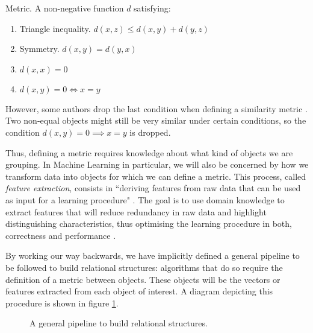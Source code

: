 \documentclass[../main.tex]{subfiles} \label{chapter_soa}
\begin{document}
\theoremstyle{definition}
\begin{definition}{Metric}.
\label{def_metric}
A non-negative function $d$ satisfying:
\begin{enumerate}
\item Triangle inequality. $d(x, z) \leq d(x, y) + d(y, z) $
\item Symmetry. $d(x, y) = d(y, x)$
\item $d(x, x) = 0$
\item $d(x, y) = 0 \iff x = y$
\end{enumerate}
\end{definition}
\par However, some authors drop the last condition when defining a similarity metric \cite{Goshtasby2012}. Two non-equal objects might still be very similar under certain conditions, so the condition $d(x, y) = 0 \implies x = y$ is dropped.
\par Thus, defining a metric requires knowledge about what kind of objects we are grouping. In Machine Learning in particular, we will also be concerned by how we transform data into objects for which we can define a metric. This process, called \emph{feature extraction}, consists in ``deriving features from raw data that can be used as input for a learning procedure" \cite{hastie2008}. The goal is to use domain knowledge to extract features that will reduce redundancy in raw data and highlight distinguishing characteristics, thus optimising the learning procedure in both, correctness and performance \cite{Bishop2006}. 
\par By working our way backwards, we have implicitly defined a general pipeline to be followed to build relational structures: algorithms that do so require the definition of a metric between objects. These objects will be the vectors or features extracted from each object of interest. A diagram depicting this procedure is shown in figure \ref{pipeline}.
\begin{figure}
\centering
{}
\caption{A general pipeline to build relational structures.}
\label{pipeline}
\end{figure}
\end{document}
